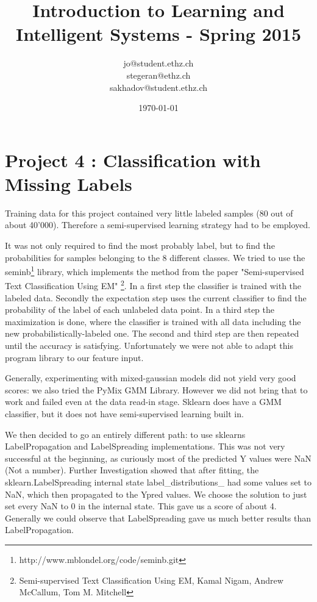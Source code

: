 \documentclass[a4paper, 11pt]{article}
\title{Introduction to Learning and Intelligent Systems - Spring 2015}
\author{jo@student.ethz.ch\\ stegeran@ethz.ch\\sakhadov@student.ethz.ch}
\date{\today}
\begin{document}
\maketitle

\section*{Project 4 : Classification with Missing Labels}

Training data for this project contained very little labeled samples (80 out of about 40'000). Therefore a semi-supervised learning strategy had to be employed.

It was not only required to find the most probably label, but to find the probabilities
for samples belonging to the 8 different classes. We tried to use the
seminb\footnote{http://www.mblondel.org/code/seminb.git} library, which implements the method
from the paper "Semi-supervised Text Classification Using EM" \footnote{Semi-supervised Text
 Classification Using EM, Kamal Nigam, Andrew McCallum, Tom M. Mitchell }. In a first step
 the classifier is trained with the labeled data. Secondly the expectation step uses the
 current classifier to find the probability of the label of each unlabeled data point.
 In a third step the maximization is done, where the classifier is trained with all data
 including the new probabilistically-labeled one. The second and third step are then repeated until the accuracy is satisfying.
Unfortunately we were not able to adapt this program library to our feature input.

Generally, experimenting with mixed-gaussian models did not yield very good scores: we
also tried the PyMix GMM Library. However we did not bring that to work and failed even
 at the data read-in stage. Sklearn does have a GMM classifier, but it does not have semi-supervised learning built in.

We then decided to go an entirely different path: to use sklearns LabelPropagation
and LabelSpreading implementations. This was not very successful at the beginning,
as curiously most of the predicted Y values were NaN (Not a number).
Further Investigation showed that after fitting, the sklearn.LabelSpreading
internal state label\_distributions\_ had some values set to NaN, which
then propagated to the Ypred values. We choose the solution to just set
every NaN to 0 in the internal state. This gave us a score of about 4.
Generally we could observe that LabelSpreading gave us much better results than LabelPropagation.
\end{document}
